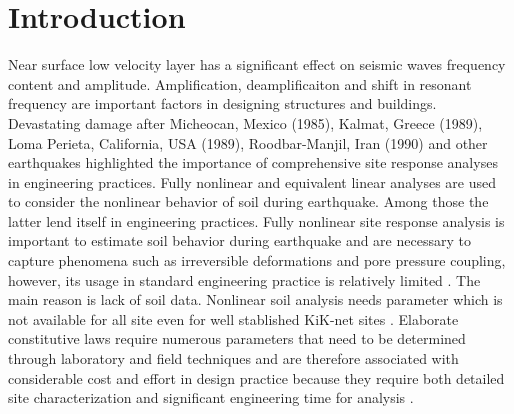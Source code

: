 
\section{Introduction}

Near surface low velocity layer has a significant effect on seismic waves frequency content and amplitude. Amplification, deamplificaiton and shift in resonant frequency are important factors in designing structures and buildings. Devastating damage after Micheocan, Mexico (1985), Kalmat, Greece (1989), Loma Perieta, California, USA (1989), Roodbar-Manjil, Iran (1990) and other earthquakes highlighted the importance of comprehensive site response analyses in engineering practices. Fully nonlinear and equivalent linear analyses are used to consider the nonlinear behavior of soil during earthquake. Among those the latter lend itself in engineering practices. Fully nonlinear site response analysis is important to estimate soil behavior during earthquake and are necessary to capture phenomena such as irreversible deformations and pore pressure coupling, however, its usage in standard engineering practice is relatively limited \citep{Assimaki2008quantifying}. The main reason is lack of soil data.  Nonlinear soil analysis needs parameter which is not available for all site even for well stablished KiK-net sites \citep{Kaklamanos2013critical}. Elaborate constitutive laws require numerous parameters that need to be determined through laboratory and  field techniques and are therefore associated with considerable cost and effort in design practice because they require both detailed site characterization and significant engineering time for analysis \citep{Assimaki2008quantifying}.

